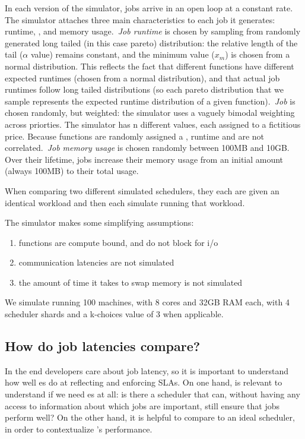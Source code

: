 In each version of the simulator, jobs arrive in an open loop at a constant
rate. The simulator attaches three main characteristics to each job it
generates: runtime, \priceclass{}, and memory usage.\ \textit{Job runtime} is
chosen by sampling from randomly generated long tailed (in this case pareto)
distribution: the relative length of the tail ($\alpha$ value) remains constant,
and the minimum value ($x_m$) is chosen from a normal distribution. This
reflects the fact that different functions have different expected runtimes
(chosen from a normal distribution), and that actual job runtimes follow long
tailed distributions (so each pareto distribution that we sample represents the
expected runtime distribution of a given function).\ \textit{Job \class{}} is
chosen randomly, but weighted: the simulator uses a vaguely bimodal weighting
across priorties. The simulator has n different \priceclass{} values, each
assigned to a fictitious price. Because functions are randomly assigned a
\class{}, runtime and \class{} are not correlated.\ \textit{Job memory usage} is
chosen randomly between 100MB and 10GB. Over their lifetime, jobs increase their
memory usage from an initial amount (always 100MB) to their total usage.

When comparing two different simulated schedulers, they each are given an
identical workload and then each simulate running that workload.

The simulator makes some simplifying assumptions:
\begin{enumerate}
    \item functions are compute bound, and do not block for i/o
    \item communication latencies are not simulated
    \item the amount of time it takes to swap memory is not simulated
\end{enumerate}

We simulate running 100 machines, with 8 cores and 32GB RAM each, with 4
scheduler shards and a k-choices value of 3 when applicable.

\subsection{How do job latencies compare?}

In the end developers care about job latency, so it is important to understand
how well \priceclass{}es do at reflecting and enforcing SLAs. On one hand, is
relevant to understand if we need \class{}es at all: is there a scheduler that
can, without having any access to information about which jobs are important,
still ensure that jobs perform well? On the other hand, it is helpful to compare
\sys{} to an ideal scheduler, in order to contextualize \sys{}'s performance.

